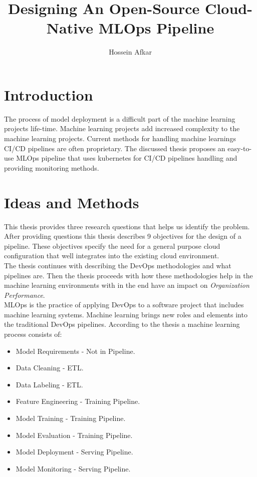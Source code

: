 \documentclass[a4paper, 10pt]{article}
\title{Designing An Open-Source Cloud-Native MLOps Pipeline}
\author{Hossein Afkar}
\theoremstyle{nonumberplain}
\begin{document}
\maketitle

\section{Introduction}
The process of model deployment is a difficult part of the machine learning
projects life-time. Machine learning projects add increased complexity to
the machine learning projects. Current methods for handling machine learnings
CI/CD pipelines are often proprietary. The discussed thesis proposes an
easy-to-use MLOps pipeline that uses kubernetes for CI/CD pipelines handling
and providing monitoring methods. \\

\section{Ideas and Methods}
This thesis provides three research questions that helps us identify the
problem. After providing questions this thesis describes 9 objectives for the
design of a pipeline. These objectives specify the need for a general purpose
cloud configuration that well integrates into the existing cloud environment. \\

The thesis continues with describing the DevOps methodologies and what
pipelines are. Then the thesis proceeds with how these methodologies help
in the machine learning environments with in the end have an impact on
\textit{Organization Performance}. \\

MLOps is the practice of applying DevOps to a software project that includes
machine learning systems. Machine learning brings new roles and elements
into the traditional DevOps pipelines. According to the thesis a machine
learning process consists of:

\begin{itemize}
    \item Model Requirements - Not in Pipeline.
    \item Data Cleaning - ETL.
    \item Data Labeling - ETL.
    \item Feature Engineering - Training Pipeline.
    \item Model Training - Training Pipeline.
    \item Model Evaluation - Training Pipeline.
    \item Model Deployment - Serving Pipeline.
    \item Model Monitoring - Serving Pipeline.
\end{itemize}
\end{document}
